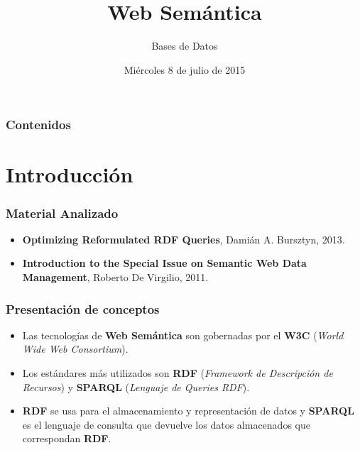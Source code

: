 \documentclass{beamer}
\title[Presentación del TP2]{Web Semántica} %
\author{Bases de Datos} %
\institute[] %
{
Federico Allocati, Sabrina Izcovich, Santiago Pernigotti, Germán Romano\\ %
\medskip
}
\date{Miércoles 8 de julio de 2015} %
\begin{document}
\begin{frame}
\titlepage %
\end{frame}

\begin{frame}
\frametitle{Contenidos} %
\tableofcontents %
\end{frame}


\section{Introducción} 
\begin{frame}
\frametitle{Material Analizado}
\begin{itemize}
\item \textbf{Optimizing Reformulated RDF Queries}, Damián A. Bursztyn, 2013.

\item \textbf{Introduction to the Special Issue on Semantic Web Data Management}, Roberto De Virgilio, 2011.
\end{itemize}
\end{frame}


\begin{frame}
\frametitle{Presentación de conceptos}
\begin{itemize}
\item Las tecnologías de \textbf{Web Semántica} son gobernadas por el \textbf{W3C} (\textit{World Wide Web Consortium}).

\item Los estándares más utilizados son \textbf{RDF} (\textit{Framework de Descripción de Recursos}) y \textbf{SPARQL} (\textit{Lenguaje de Queries RDF}).

\item \textbf{RDF} se usa para el almacenamiento y representación de datos y \textbf{SPARQL} es el lenguaje de consulta que devuelve los datos almacenados que correspondan \textbf{RDF}.
\end{itemize}
\end{frame}
\end{document}
